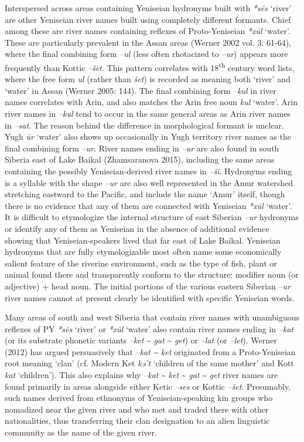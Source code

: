 Interspersed across areas containing Yeniseian hydronyms built with \textit{*s\=es} ‘river’ are other Yeniseian river names built using completely different formants. Chief among these are river names containing reflexes of Proto-Yeniseian \textit{*x\=ul} ‘water’. These are particularly prevalent in the Assan areas (Werner 2002 vol. 3: 61-64), where the final combining form \textit{–ul} (less often rhotacized to \textit{–ur}) appears more frequently than Kottic \textit{–šet}. This pattern correlates with 18\textsuperscript{th} century word lists, where the free form \textit{ul} (rather than \textit{šet}) is recorded as meaning both ‘river’ and ‘water’ in Assan (Werner 2005: 144). The final combining form \textit{–kul} in river names correlates with Arin, and also matches the Arin free noun \textit{kul} ‘water’. Arin river names in \textit{–kul} tend to occur in the same general areas as Arin river names in \textit{–sat}. The reason behind the difference in morphological formant is unclear. Yugh \textit{\=ur} ‘water’ also shows up occasionally in Yugh territory river names as the final combining form \textit{–ur}. River names ending in \textit{–ur }are also found in south Siberia east of Lake Baikal (Zhamsaranova 2015), including the same areas containing the possibly Yeniseian-derived river names in \textit{–ši}. Hydronyms ending is a syllable with the shape \textit{–ur} are also well represented in the Amur watershed stretching eastward to the Pacific, and include the name ‘Amur’ itself, though there is no evidence that any of them are connected with Yeniseian \textit{*x\=ul} ‘water’. It is difficult to etymologize the internal structure of east Siberian \textit{–ur} hydronyms or identify any of them as Yeniseian in the absence of additional evidence showing that Yeniseian-speakers lived that far east of Lake Baikal. Yeniseian hydronyms that are fully etymologizable most often name some economically salient feature of the riverine environment, such as the type of fish, plant or animal found there and transparently conform to the structure: modifier noun (or adjective) + head noun. The initial portions of the various eastern Siberian –\textit{ur} river names cannot at present clearly be identified with specific Yeniseian words.

Many areas of south and west Siberia that contain river names with unambiguous reflexes of PY \textit{*s\=es} ‘river’ or \textit{*x\=ul} ‘water’ also contain river names ending in \textit{–kat }(or its substrate phonetic variants \textit{–ket} \~{} \textit{gat} \~{} \textit{get}) or \textit{–lat }(or \textit{–let}). Werner (2012) has argued persuasively that \textit{–kat \~{} ket }originated from a Proto-Yeniseian root meaning ‘clan’ (cf. Modern Ket \textit{kə’t} ‘children of the same mother’ and Kott \textit{kat} ‘children’). This also explains why \textit{–kat }\~{} \textit{ket} \~{} \textit{gat} \~{} \textit{get} river names are found primarily in areas alongside either Ketic \textit{–ses} or Kottic \textit{–šet}. Presumably, such names derived from ethnonyms of Yeniseian-speaking kin groups who nomadized near the given river and who met and traded there with other nationalities, thus transferring their clan designation to an alien linguistic community as the name of the given river.

